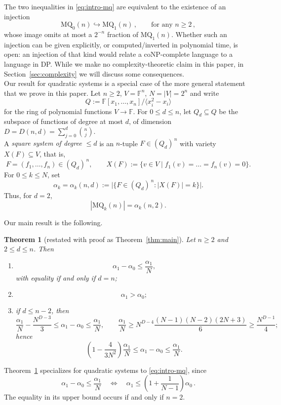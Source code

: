 \documentclass[11pt,a4paper]{article}
\newtheorem{theorem}{Theorem}[section]
\theoremstyle{definition}
\newcommand{\MQ}{\mathrm{MQ}}
\newcommand{\FF}{\mathbb{F}}
\begin{document}
The two inequalities in
\eqref{eq:intro-mq} are equivalent to the existence of an
injection
\[
\MQ_0(n)\hookrightarrow\MQ_1(n)\,,\qquad \mbox{for any } n\geq 2\,,
\]
whose image omits at most a $2^{-n}$ fraction of $\MQ_1(n)$.
Whether such an injection can be given explicitly, or computed/inverted
in polynomial time, is open: an injection of that kind would relate a
coNP-complete language to a language in DP. While we make no
complexity-theoretic claim in this paper,
in Section~\ref{sec:complexity} we will discuss some consequences.
\\

Our result for quadratic systems is a special case of the more general
statement that we prove in this paper. Let
$n\ge 2$, $V=\FF^n$, $N=|V|=2^n$ and write
$$
Q:=\FF[x_1,\dots,x_n]/\langle x_i^2-x_i\rangle
$$
for the ring of polynomial functions $V\to\FF$. 
For $0\le d\le n$,
let $Q_d\subseteq Q$ be the subspace of functions of degree at most
$d$, of dimension
$
D=D(n,d)=\sum_{j=0}^{d}\binom n j
$.\\
A \emph{square system of degree $\le d$} is an $n$-tuple
$F\in (Q_d)^{\,n}$ with variety $X(F)\subseteq V$, that is,
\[
F=(f_1,\dots,f_n)\in (Q_d)^{\,n}, \qquad 
X(F):=\{v\in V \mid f_1(v)=\dots=f_n(v)=0\}.
\]
For $0\le k\le N$, set
\[
\alpha_k=\alpha_k(n,d)
:=
\bigl|\{F\in (Q_d)^{\,n}:|X(F)|=k\}\bigr|.
\]
Thus, for $d=2$,
\[
|\MQ_k(n)|=\alpha_k(n,2).
\]

\newpage

Our main result is the following.
%
\begin{theorem}[restated with proof as Theorem~\ref{thm:main}]\label{thm:intro}
Let $n\ge 2$ and $2\le d\le n$. Then
\begin{enumerate}[label=\textnormal{(\roman*)}]
\item
\[
\alpha_1-\alpha_0\le\frac{\alpha_1}{N},
\]
with equality if and only if $d=n$;

\item
\[
\alpha_1>\alpha_0;
\]

\item if $d\le n-2$, then
\[
\frac{\alpha_1}{N}-\frac{N^{D-3}}{3}
\le
\alpha_1-\alpha_0
\le
\frac{\alpha_1}{N},
\qquad
\frac{\alpha_1}{N}
\ge
N^{D-4}\frac{(N-1)(N-2)(2N+3)}{6}
\ge
\frac{N^{D-1}}{4};
\]
hence
\[
\left(1-\frac4{3N^2}\right)\frac{\alpha_1}{N}
\le
\alpha_1-\alpha_0
\le
\frac{\alpha_1}{N}.
\]
\end{enumerate}
\end{theorem}

Theorem~\ref{thm:intro} specializes for quadratic systems to
\eqref{eq:intro-mq}, since
\[
\alpha_1-\alpha_0\le\frac{\alpha_1}{N}
\quad\Longleftrightarrow\quad
\alpha_1\le
\left(1+\frac1{N-1}\right)\alpha_0\,.
\]
The equality in its upper bound occurs if and only if
$n=2$.
\end{document}
